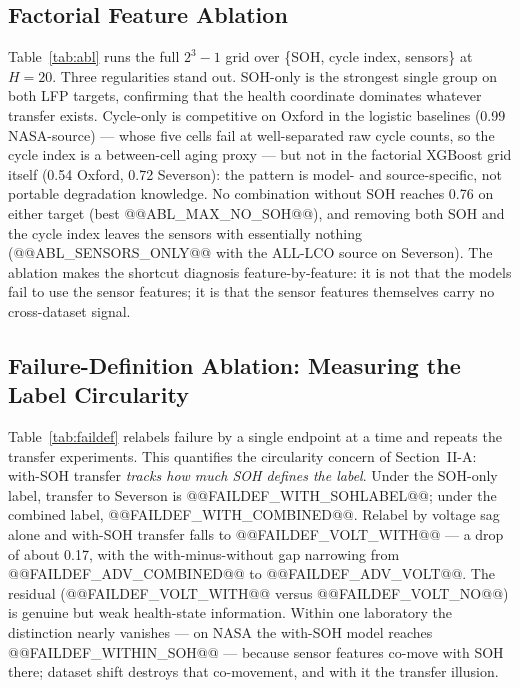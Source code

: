 \subsection{Factorial Feature Ablation}
Table~\ref{tab:abl} runs the full $2^3-1$ grid over \{SOH, cycle index, sensors\} at $H{=}20$. Three regularities stand out. SOH-only is the strongest single group on both LFP targets, confirming that the health coordinate dominates whatever transfer exists. Cycle-only is competitive on Oxford in the logistic baselines (0.99 NASA-source) --- whose five cells fail at well-separated raw cycle counts, so the cycle index is a between-cell aging proxy --- but not in the factorial XGBoost grid itself (0.54 Oxford, 0.72 Severson): the pattern is model- and source-specific, not portable degradation knowledge. No combination without SOH reaches 0.76 on either target (best @@ABL_MAX_NO_SOH@@), and removing both SOH and the cycle index leaves the sensors with essentially nothing (@@ABL_SENSORS_ONLY@@ with the ALL-LCO source on Severson). The ablation makes the shortcut diagnosis feature-by-feature: it is not that the models fail to use the sensor features; it is that the sensor features themselves carry no cross-dataset signal.

\begin{table}[!t]
\caption{Factorial Feature Ablation at H=20 (XGBoost, Pooled AUC With Cell-Level Bootstrap 95\% CI). Feature Groups: SOH; Cycle Index; Sensors = Voltages, Current, Temperature, Duration.}
\label{tab:abl}
\centering
{}
\end{table}

\subsection{Failure-Definition Ablation: Measuring the Label Circularity}
Table~\ref{tab:faildef} relabels failure by a single endpoint at a time and repeats the transfer experiments. This quantifies the circularity concern of Section~II-A: with-SOH transfer \emph{tracks how much SOH defines the label}. Under the SOH-only label, transfer to Severson is @@FAILDEF_WITH_SOHLABEL@@; under the combined label, @@FAILDEF_WITH_COMBINED@@. Relabel by voltage sag alone and with-SOH transfer falls to @@FAILDEF_VOLT_WITH@@ --- a drop of about 0.17, with the with-minus-without gap narrowing from @@FAILDEF_ADV_COMBINED@@ to @@FAILDEF_ADV_VOLT@@. The residual (@@FAILDEF_VOLT_WITH@@ versus @@FAILDEF_VOLT_NO@@) is genuine but weak health-state information. Within one laboratory the distinction nearly vanishes --- on NASA the with-SOH model reaches @@FAILDEF_WITHIN_SOH@@ --- because sensor features co-move with SOH there; dataset shift destroys that co-movement, and with it the transfer illusion.

